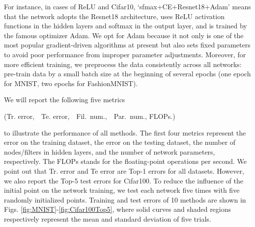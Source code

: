 \documentclass[journal]{IEEEtran}
\begin{document}
{For instance, in cases of ReLU and Cifar10, `sfmax+CE+Resnet18+Adam' means that the network  adopts the   Resnet18 architecture, uses ReLU activation functions in the hidden layers and softmax in the output layer, and is trained by the famous optimizer Adam.  We  opt for  Adam because it not only is one of the most popular gradient-driven algorithms at present but also sets fixed parameters to avoid poor performance from improper parameter adjustments. Moreover, for more efficient training, we preprocess the data consistently across all networks: pre-train data by a small batch size at the beginning of several epochs (one epoch for MNIST, two epochs for FashionMNIST). }



We will report the following five metrics
\begin{center}
(Tr. error,~~Te. error,~~Fil.~num.,~~Par.~num., FLOPs.)
\end{center}
to illustrate the performance of all methods. The first four metrics represent the error on the training dataset, the error on the testing dataset, the number of nodes/filters in hidden layers, and the number of network parameters, respectively. The FLOPs stands for the floating-point operations per second. { We point out that Tr. error and Te error are  Top-1 errors for all datasets. However, we also report the Top-5 test errors for Cifar100. To reduce the influence of the initial point on the network training, we test each network five times with five randomly initialized points. Training and test errors of 10 methods are shown in  Figs. \ref{fig:MNIST}-\ref{fig:Cifar100Top5}, where solid curves and shaded regions respectively represent the mean and standard deviation of five trials.}
\end{document}
